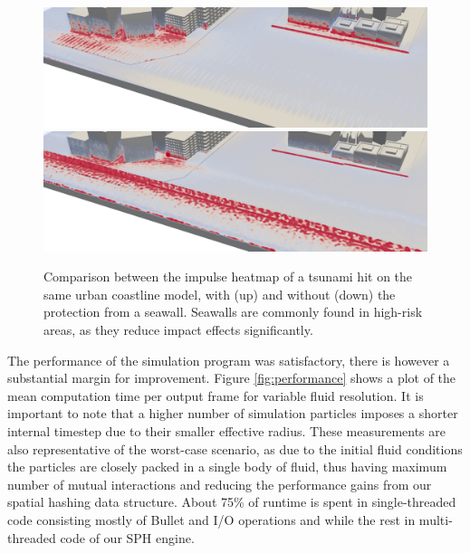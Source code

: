 \documentclass{llncs}
\begin{document}
\begin{figure}
  \includegraphics[width=\textwidth]{figures/if-city0-free.png}
  \includegraphics[width=\textwidth]{figures/if-city0-seawall.png}
  \caption{Comparison between the impulse heatmap of a tsunami hit on the same urban
    coastline model, with (up) and without (down) the protection from a seawall. Seawalls
    are commonly found in high-risk areas, as they reduce impact effects significantly.}
  \label{fig:impulse-field}
\end{figure}

The performance of the simulation program was satisfactory, there is however a substantial
margin for improvement. Figure \ref{fig:performance} shows a plot of the mean computation
time per output frame for variable fluid resolution. It is important to note that a higher
number of simulation particles imposes a shorter internal timestep due to their smaller
effective radius. These measurements are also representative of the worst-case scenario,
as due to the initial fluid conditions the particles are closely packed in a single body
of fluid, thus having maximum number of mutual interactions and reducing the performance
gains from our spatial hashing data structure. About 75\% of runtime is spent in
single-threaded code consisting mostly of Bullet and I/O operations and while the rest in
multi-threaded code of our SPH engine.
\end{document}
